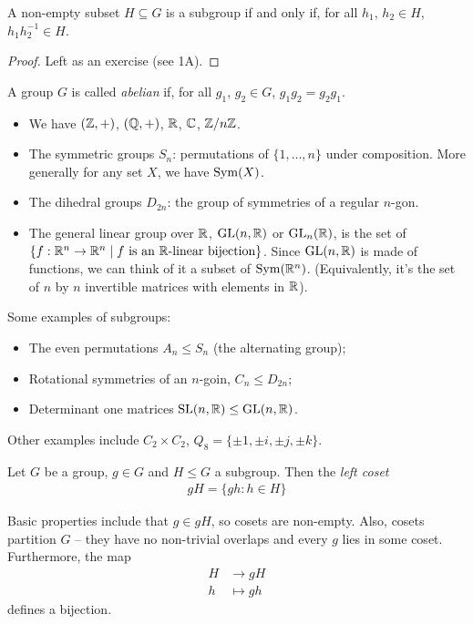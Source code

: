 \documentclass{../template/note}
\begin{document}
    \begin{proposition}
        A non-empty subset $H \subseteq G$ is a subgroup if and only if, for all $h_1$, $h_2 \in H$, $h_1h_2^{-1} \in H$.
    \end{proposition}
    
    \begin{proof}
        Left as an exercise (see 1A).
    \end{proof}
    
    \begin{definition}
        A group $G$ is called \emph{abelian} if, for all $g_1$, $g_2 \in G$, $g_1g_2 = g_2g_1$.
    \end{definition}
    
    \begin{example}
        \begin{itemize}
            \item We have $(\mathbb Z, +)$, $(\mathbb Q, +)$, $\mathbb R$, $\mathbb C$, $\mathbb Z/n\mathbb Z$.
            \item The symmetric groups $S_n$: permutations of $\{1, \dots, n\}$ under composition. More generally for any set $X$, we have $\operatorname{Sym}(X)$.
            \item The dihedral groups $D_{2n}$: the group of symmetries of a regular $n$-gon.
            \item The general linear group over $\mathbb R$, $\operatorname{GL}(n, \mathbb R)$ or $\operatorname{GL}_n(\mathbb R)$, is the set of $\{f: \mathbb R^n \to \mathbb R^n \mid f \text{ is an }\mathbb R\text{-linear bijection}\}$. Since $\operatorname{GL}(n, \mathbb R)$ is made of functions, we can think of it a subset of $\operatorname{Sym}(\mathbb R^n)$. (Equivalently, it's the set of $n$ by $n$ invertible matrices with elements in $\mathbb R$).
        \end{itemize}
        Some examples of subgroups:
        \begin{itemize}
            \item The even permutations $A_n \leq S_n$ (the alternating group);
            \item Rotational symmetries of an $n$-goin, $C_n \leq D_{2n}$;
            \item Determinant one matrices $\operatorname{SL}(n, \mathbb R) \leq \operatorname{GL}(n, \mathbb R)$.
        \end{itemize}
        Other examples include $C_2 \times C_2$, $Q_8 = \{\pm 1, \pm i, \pm j, \pm k\}$.        
    \end{example}
    
    \begin{definition}
        Let $G$ be a group, $g \in G$ and $H \leq G$ a subgroup. Then the \emph{left coset}
        \begin{align*}
            gH = \{gh: h \in H\}
        \end{align*}
    \end{definition}
    Basic properties include that $g \in gH$, so cosets are non-empty. Also, cosets partition $G$ -- they have no non-trivial overlaps and every $g$ lies in some coset. Furthermore, the map
    \begin{align*}
        H &\to gH \\
        h &\mapsto gh
    \end{align*}
    defines a bijection.
    
\end{document}
